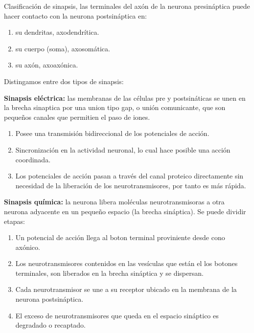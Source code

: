 Clasificación de sinapsis, las terminales del axón de la neurona presináptica puede hacer contacto con la neurona postsináptica en:
\begin{enumerate}
 \item su dendritas, axodendrítica.
 \item su cuerpo (soma), axosomática. 
 \item su axón, axoaxónica.
\end{enumerate}

Distingamos entre dos tipos de sinapsis:

 \textbf{Sinapsis eléctrica:} las membranas de las células pre y postsináticas se unen en la brecha sinaptica por una union tipo gap, o unión comunicante, que son pequeños canales que permitien el paso de iones.

	\begin{enumerate}
  	 \item Posee una transmisión bidireccional de los potenciales de acción.
  	 \item Sincronización en la actividad neuronal, lo cual hace posible una acción coordinada.
 	 \item Los potenciales de acción pasan a través del canal proteico directamente sin necesidad de la liberación de los neurotransmisores, por tanto es más rápida.
	\end{enumerate}
 
 \textbf{Sinapsis química:} la neurona libera moléculas neurotransmisoras a otra neurona adyacente en un pequeño espacio (la brecha sináptica). Se puede dividir etapas:

\begin{enumerate}
 \item Un potencial de acción llega al boton terminal proviniente desde cono axónico.
 \item Los neurotransmisores contenidos en las vesículas que están el los botones terminales, son liberados en la brecha sináptica y se dispersan.
 \item Cada neurotransmisor se une a su receptor ubicado en la membrana de la neurona postsináptica.
 \item El exceso de neurotransmisores que queda en el espacio sináptico es degradado o recaptado.
\end{enumerate}


